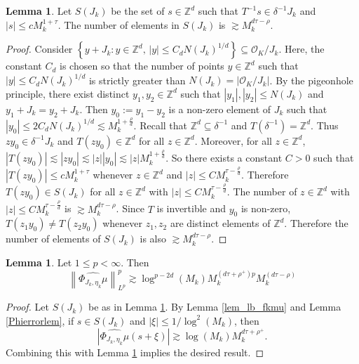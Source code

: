 \documentclass{amsart}
\numberwithin{equation}{section}
\theoremstyle{definition}
\newtheorem{lemma}[theorem]{Lemma}
\theoremstyle{definition}
\def\ZZ{\mathbb{Z}}
\newcommand{\cbr}[1]{ \left\{ {#1} \right\} }
\newcommand{\norm}[1]{\left\|#1\right\|}
\newcommand{\OK}{\mathcal{O}_K}
\begin{document}
\begin{lemma}\label{count lemma}
Let $S(J_k)$ be the set of $s \in \ZZ^d$ such that $T^{-1} s \in \delta^{-1} J_k$ and $|s| \leq cM_k^{1+\tau}$. The number of elements in $S(J_k)$ is 
$
\gtrsim M_k^{d\tau - \rho}. 
$
\end{lemma}
\begin{proof}
Consider $\cbr{y+J_k : y \in \ZZ^d, \, |y| \leq C_d N(J_k)^{1/d}} \subseteq  \OK/J_k$. 
Here, the constant $C_d$ is chosen so that the number of points $y \in \ZZ^d$ such that $|y| \leq C_d N(J_k)^{1/d}$ is strictly greater than $N(J_k) = |\OK/J_k|$. 
By the pigeonhole principle, there exist distinct $y_1,y_2 \in \ZZ^d$ such that $|y_1|,|y_2| \leq N(J_k)$ and $y_1+J_k = y_2+J_k$. 
Then $y_0 := y_1 - y_2$ is a non-zero element of $J_k$ such that $|y_0| \leq 2C_dN(J_k)^{1/d} \lesssim M_k^{1+\frac{\rho}{d}}$. 
%
Recall that $\ZZ^d \subseteq \delta^{-1}$ and $T(\delta^{-1}) = \ZZ^d$. 
Thus $zy_0 \in \delta^{-1} J_k$ and $T(zy_0) \in \ZZ^d$ for all $z \in \ZZ^d$. 
Moreover, for all $z \in \ZZ^d$, 
$|T(zy_0)|
\lesssim 
|zy_0|
\lesssim 
|z||y_0|
\lesssim |z|M_k^{1+\frac{\rho}{d}}$. 
So there exists a constant $C>0$ such that $|T(zy_0)| \leq c M_k^{1+\tau}$ whenever $z \in \ZZ^d$ and $|z| \leq CM_k^{\tau-\frac{\rho}{d}}$. 
Therefore $T(zy_0) \in S(J_k)$ for all  $z \in \ZZ^d$ with $|z| \leq  CM_k^{\tau - \frac{\rho}{d}}$. 
The number of $z \in \ZZ^d$ with $|z| \leq C M_k^{\tau - \frac{\rho}{d}}$ is  $\gtrsim M_k^{d\tau - \rho}$. 
Since $T$ is invertible and $y_0$ is non-zero, $T(z_1 y_0) \neq T(z_2 y_0)$ whenever $z_1,z_2$ are distinct elements of $\ZZ^d$. 
Therefore the number of elements of $S(J_k)$ is also $\gtrsim M_k^{d\tau - \rho}$. 
\end{proof}


\begin{lemma}\label{PhihatLpnorm v2}
Let $1 \leq p < \infty$. Then 
\[\norm{\widehat{\Phi_{J_k, \eta_k} \mu} }_{L^p}^p \gtrsim \log^{{p - 2d}}(M_k)  
M_k^{(d \tau + \rho^+) p}
M_k^{ (d \tau - \rho)}
\]
\end{lemma}
\begin{proof}
Let $S(J_k)$ be as in Lemma \ref{count lemma}. 
By Lemma \ref{lem_lb_fkmu} and Lemma \ref{Phierrorlem}, if $s \in S(J_k)$ and $|\xi| \leq {1}/{\log^2(M_k)}$, 
then 
\[
\left|\widehat{\Phi_{J_k, \eta_k} \mu}(s + \xi)\right| \gtrsim 
\log(M_k) 
M_k^{d \tau + \rho^+}.
\]
Combining this with Lemma \ref{count lemma} implies the desired result. 
\end{proof}
\end{document}
